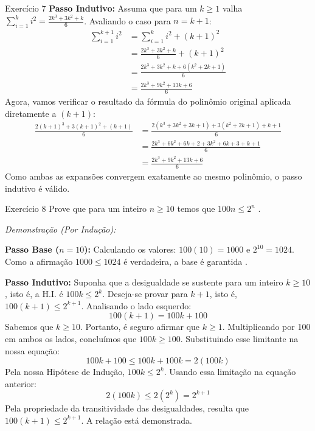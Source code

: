 \documentclass[a4paper,11pt]{article}
\theoremstyle{definition}
\theoremstyle{plain}
\theoremstyle{remark}
\newcounter{questao}[section]
\begin{document}
\begin{questaoManually}{Exercício 7}
\textbf{Passo Indutivo:}
Assuma que para um $k \ge 1$ valha $\sum_{i=1}^k i^2 = \frac{2k^3 + 3k^2 + k}{6}$.
Avaliando o caso para $n = k+1$:
\begin{align*}
\sum_{i=1}^{k+1} i^2 &= \sum_{i=1}^k i^2 + (k+1)^2 \\
&= \frac{2k^3 + 3k^2 + k}{6} + (k+1)^2 \tag{H.I.}\\
&= \frac{2k^3 + 3k^2 + k + 6(k^2 + 2k + 1)}{6} \\
&= \frac{2k^3 + 9k^2 + 13k + 6}{6}
\end{align*}
Agora, vamos verificar o resultado da fórmula do polinômio original aplicada diretamente a $(k+1)$:
\begin{align*}
\frac{2(k+1)^3 + 3(k+1)^2 + (k+1)}{6} &= \frac{2(k^3+3k^2+3k+1) + 3(k^2+2k+1) + k + 1}{6} \\
&= \frac{2k^3 + 6k^2 + 6k + 2 + 3k^2 + 6k + 3 + k + 1}{6} \\
&= \frac{2k^3 + 9k^2 + 13k + 6}{6}
\end{align*}
Como ambas as expansões convergem exatamente ao mesmo polinômio, o passo indutivo é válido. \blacksquare

\end{questaoManually}
\newpage \begin{questaoManually}{Exercício 8}
Prove que para um inteiro $n \ge 10$ temos que $100n \le 2^n$ .

\textit{Demonstração (Por Indução):}

\textbf{Passo Base ($n=10$):}
Calculando os valores: $100(10) = 1000$ e $2^{10} = 1024$. Como a afirmação $1000 \le 1024$ é verdadeira, a base é garantida .

\textbf{Passo Indutivo:}
Suponha que a desigualdade se sustente para um inteiro $k \ge 10$, isto é, a H.I. é $100k \le 2^k$.
Deseja-se provar para $k+1$, isto é, $100(k+1) \le 2^{k+1}$. Analisando o lado esquerdo:
\begin{equation}
100(k+1) = 100k + 100
\end{equation}
Sabemos que $k \ge 10$. Portanto, é seguro afirmar que $k \ge 1$. Multiplicando por 100 em ambos os lados, concluímos que $100k \ge 100$. Substituindo esse limitante na nossa equação:
\begin{equation}
100k + 100 \le 100k + 100k = 2(100k)
\end{equation}
Pela nossa Hipótese de Indução, $100k \le 2^k$. Usando essa limitação na equação anterior:
\begin{equation}
2(100k) \le 2(2^k) = 2^{k+1}
\end{equation}
Pela propriedade da transitividade das desigualdades, resulta que $100(k+1) \le 2^{k+1}$. A relação está demonstrada. \blacksquare

\end{questaoManually}
\end{document}

